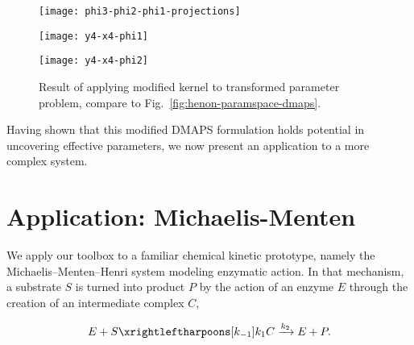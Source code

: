 \begin{figure*}
  \begin{minipage}[c][13cm][t]{.5\textwidth}
    \vspace{2cm} \centering
    \texttt{[image: phi3-phi2-phi1-projections]}
    \label{fig:test1}
  \end{minipage}%
  \begin{minipage}[c][13cm][t]{.5\textwidth}
    \vspace{\fill} \centering
    \texttt{[image: y4-x4-phi1]}
    \label{fig:test2}\par\vfill
    \texttt{[image: y4-x4-phi2]}
    \label{fig:test3}\par\vfill
  \end{minipage}
  \caption[Plot of modified DMAPS results on transformed model]{Result
    of applying modified kernel to transformed parameter problem,
    compare to
    Fig.~\ref{fig:henon-paramspace-dmaps}. \label{fig:henon-data-dmaps}
  }
\end{figure*}


Having shown that this modified DMAPS formulation holds potential in
uncovering effective parameters, we now present an application to a
more complex system.

\clearpage

\section{Application: Michaelis-Menten}

We apply our toolbox to a familiar chemical kinetic prototype, namely
the Michaelis--Menten--Henri system modeling enzymatic action.  In
that mechanism, a substrate $S$ is turned into product $P$ by the
action of an enzyme $E$ through the creation of an intermediate
complex $C$,

\begin{align}
 E + S \xrightleftharpoons[k_{-1}]{k_1} C \xrightarrow[]{k_2} E + P
. \label{mech:mm}
\end{align}

